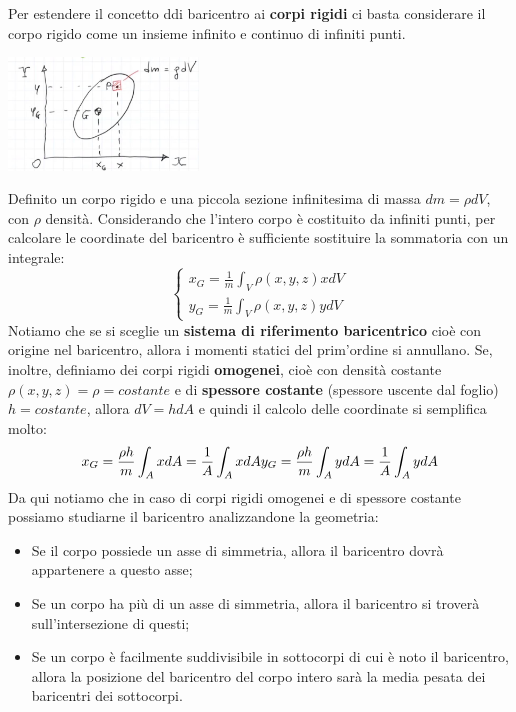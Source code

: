 Per estendere il concetto ddi baricentro ai \textbf{corpi rigidi} ci basta considerare il corpo rigido come un insieme infinito e continuo di infiniti punti.\newline
{}
\begin{center}
    \includegraphics[height=3cm]{../lezione8/img2.JPG}
\end{center}
Definito un corpo rigido e una piccola sezione infinitesima di massa $dm = \rho dV $, con $\rho$ densità. Considerando che l'intero corpo è costituito da infiniti punti, per calcolare le coordinate del baricentro è sufficiente sostituire la sommatoria con un integrale:
\[
    \begin{cases}
        x_G = \frac{1}{m} \int_V \rho (x,y,z) x dV\\
        y_G = \frac{1}{m} \int_V \rho(x,y,z) y dV
    \end{cases}
\]
Notiamo che se si sceglie un \textbf{sistema di riferimento baricentrico} cioè con origine nel baricentro, allora i momenti statici del prim'ordine si annullano.\newline
\newline
Se, inoltre, definiamo dei corpi rigidi \textbf{omogenei}, cioè con densità costante $\rho(x,y,z) = \rho = costante$ e di \textbf{spessore costante} (spessore uscente dal foglio) $h = costante$, allora $dV = h dA$ e quindi il calcolo delle coordinate si semplifica molto:
\[
    x_G = \frac{\rho h}{m} \int_{A} x dA = \frac{1}{A} \int_{A} x dA\\
    y_G = \frac{\rho h}{m} \int_{A} y dA = \frac{1}{A} \int_{A} y dA
\]
Da qui notiamo che in caso di corpi rigidi omogenei e di spessore costante possiamo studiarne il baricentro analizzandone la geometria:
\begin{itemize}
    \item Se il corpo possiede un asse di simmetria, allora il baricentro dovrà appartenere a questo asse;
    \item Se un corpo ha più di un asse di simmetria, allora il baricentro si troverà sull'intersezione di questi;
    \item Se un corpo è facilmente suddivisibile in sottocorpi di cui è noto il baricentro, allora la posizione del baricentro del corpo intero sarà la media pesata dei baricentri dei sottocorpi.
\end{itemize}
